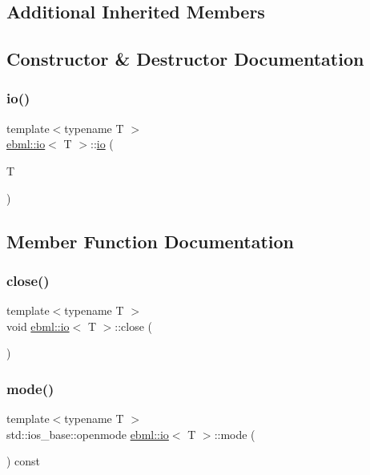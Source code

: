 \subsection*{Additional Inherited Members}


\subsection{Constructor \& Destructor Documentation}
\mbox{\label{classebml_1_1io_acf15f9f08eb2e65c72363320aa8bc112}} 
\subsubsection{\texorpdfstring{io()}{io()}}
{\footnotesize\ttfamily template$<$typename T $>$ \\
\mbox{\hyperlink{classebml_1_1io}{ebml\+::io}}$<$ T $>$\+::\mbox{\hyperlink{classebml_1_1io}{io}} (\begin{DoxyParamCaption}\item[{T}]{ }\end{DoxyParamCaption})}



\subsection{Member Function Documentation}
\mbox{\label{classebml_1_1io_a929714d05587d37d46bf8813b35c788d}} 
\subsubsection{\texorpdfstring{close()}{close()}}
{\footnotesize\ttfamily template$<$typename T $>$ \\
void \mbox{\hyperlink{classebml_1_1io}{ebml\+::io}}$<$ T $>$\+::close (\begin{DoxyParamCaption}{ }\end{DoxyParamCaption})}

\mbox{\label{classebml_1_1io_ab1143b5c835958387d95695151744d33}} 
\subsubsection{\texorpdfstring{mode()}{mode()}}
{\footnotesize\ttfamily template$<$typename T $>$ \\
std\+::ios\+\_\+base\+::openmode \mbox{\hyperlink{classebml_1_1io}{ebml\+::io}}$<$ T $>$\+::mode (\begin{DoxyParamCaption}{ }\end{DoxyParamCaption}) const}

